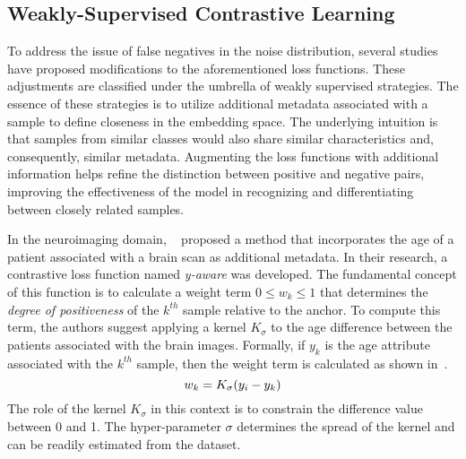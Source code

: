 \subsection{Weakly-Supervised Contrastive Learning}
To address the issue of false negatives in the noise distribution, several
studies have proposed modifications to the aforementioned loss functions. These
adjustments are classified under the umbrella of weakly supervised strategies.
The essence of these strategies is to utilize additional metadata associated
with a sample to define closeness in the embedding space. The underlying
intuition is that samples from similar classes would also share similar
characteristics and, consequently, similar metadata. Augmenting the loss
functions with additional information helps refine the distinction between
positive and negative pairs, improving the effectiveness of the model in
recognizing and differentiating between closely related samples.

In the neuroimaging domain,
\citeauthor{dufumier_contrastive_2021}~
proposed a method that incorporates the age of a patient associated with a brain
scan as additional metadata. In their research, a contrastive loss function
named \emph{y-aware} was developed. The
fundamental concept of this function is to calculate a weight term $0 \leq w_k
\leq 1$ that determines the \emph{degree of positiveness} of the $k^{th}$ sample
relative to the anchor. To compute this term, the authors suggest applying a
kernel $K_\sigma$ to
the age difference between the patients associated with the brain images.
Formally, if $y_k$ is the age attribute associated with the $k^{th}$ sample,
then the weight term is calculated as shown
in~.
\begin{equation}
    \labeq{4_3}
    w_k = K_\sigma(y_i - y_k)
\end{equation}
The role of the kernel $K_\sigma$ in this context is to constrain the difference
value between 0 and 1. The hyper-parameter $\sigma$ determines the spread of the
kernel and can be readily estimated from the dataset.

